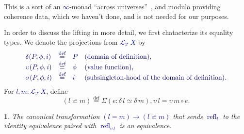 \documentclass[10pt]{article}
\newcommand{\db}{\textcolor{darkblue}}
\newcommand{\m}[1]{\db{$#1$}}
\newcommand{\M}[1]{\[\db{#1}\]}
\newcommand{\comp}{\mathrel{\circ}}
\newcommand{\T}{\mathcal{T}}
\newcommand{\Lift}{\mathcal{L}}
\newcommand{\refl}{\operatorname{refl}}
\newcommand{\eqdef}{\overset{\text{def}}{=}}
\newtheorem{numbered}{}
\theoremstyle{definition}
\begin{document}
This is a sort of an \m{\infty}-monad ``across
universes''~\cite{TypeTopology}, and modulo providing coherence data,
which we haven't done, and is not needed for our purposes.

In order to discuss the lifting in more detail, we first chatacterize
its equality types. We denote the projections from \m{\Lift_{\T}
  \, X} by
%
\M{
  \begin{array}{llll}
    \delta (P , \phi , i) & \eqdef & P & \text{(domain of definition),} \\
    \upsilon (P , \phi , i) & \eqdef & \phi & \text{(value function),} \\
    \sigma(P , \phi , i) & \eqdef & i & \text{(subsingleton-hood of the domain of definition).}
  \end{array}
}
%
For \m{l , m : \Lift_{\T} \, X}, define
\[
  (l \backsimeq m) \eqdef \Sigma (e : \delta \, l \simeq \delta \, m), \upsilon \, l = \upsilon \, m \comp e.
\]
\begin{numbered}
  The canonical transformation \m{(l = m) \to (l \backsimeq m)} that
  sends \m{\refl_l} to the identity equivalence paired with \m{\refl_{\upsilon \,
      l}} is an equivalence.
\end{numbered}
\end{document}

